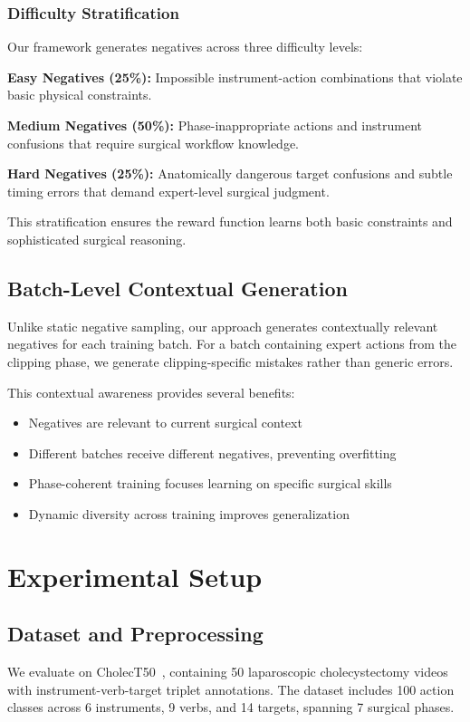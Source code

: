 \documentclass[runningheads]{llncs}
\begin{document}
\subsubsection{Difficulty Stratification}
Our framework generates negatives across three difficulty levels:

\textbf{Easy Negatives (25\%):} Impossible instrument-action combinations that violate basic physical constraints.

\textbf{Medium Negatives (50\%):} Phase-inappropriate actions and instrument confusions that require surgical workflow knowledge.

\textbf{Hard Negatives (25\%):} Anatomically dangerous target confusions and subtle timing errors that demand expert-level surgical judgment.

This stratification ensures the reward function learns both basic constraints and sophisticated surgical reasoning.

\subsection{Batch-Level Contextual Generation}

Unlike static negative sampling, our approach generates contextually relevant negatives for each training batch. For a batch containing expert actions from the clipping phase, we generate clipping-specific mistakes rather than generic errors.

This contextual awareness provides several benefits:
\begin{itemize}
\item Negatives are relevant to current surgical context
\item Different batches receive different negatives, preventing overfitting
\item Phase-coherent training focuses learning on specific surgical skills
\item Dynamic diversity across training improves generalization
\end{itemize}

\section{Experimental Setup}

\subsection{Dataset and Preprocessing}
We evaluate on CholecT50~\cite{nwoye2022cholect50}, containing 50 laparoscopic cholecystectomy videos with instrument-verb-target triplet annotations. The dataset includes 100 action classes across 6 instruments, 9 verbs, and 14 targets, spanning 7 surgical phases.
\end{document}
